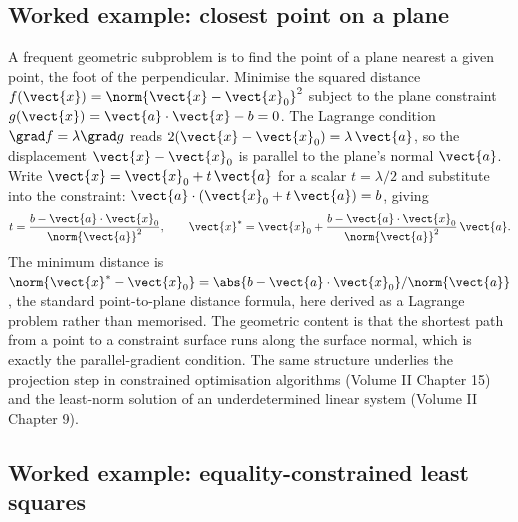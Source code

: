 \subsection{Worked example: closest point on a plane}

A frequent geometric subproblem is to find the point of a plane
nearest a given point, the foot of the perpendicular. Minimise the
squared distance $f(\vect{x}) = \norm{\vect{x} - \vect{x}_{0}}^{2}$
subject to the plane constraint $g(\vect{x}) = \vect{a} \cdot
\vect{x} - b = 0$. The Lagrange condition $\grad f = \lambda \grad
g$ reads $2(\vect{x} - \vect{x}_{0}) = \lambda\,\vect{a}$, so the
displacement $\vect{x} - \vect{x}_{0}$ is parallel to the plane's
normal $\vect{a}$. Write $\vect{x} = \vect{x}_{0} + t\,\vect{a}$ for
a scalar $t = \lambda/2$ and substitute into the constraint:
$\vect{a} \cdot (\vect{x}_{0} + t\,\vect{a}) = b$, giving
\[
t = \frac{b - \vect{a} \cdot \vect{x}_{0}}{\norm{\vect{a}}^{2}},
\qquad
\vect{x}^{*} = \vect{x}_{0} + \frac{b - \vect{a} \cdot \vect{x}_{0}}
{\norm{\vect{a}}^{2}}\,\vect{a}.
\]
The minimum distance is $\norm{\vect{x}^{*} - \vect{x}_{0}} =
\abs{b - \vect{a}\cdot\vect{x}_{0}}/\norm{\vect{a}}$, the standard
point-to-plane distance formula, here derived as a Lagrange problem
rather than memorised. The geometric content is that the shortest
path from a point to a constraint surface runs along the surface
normal, which is exactly the parallel-gradient condition. The same
structure underlies the projection step in constrained optimisation
algorithms (Volume II Chapter 15) and the least-norm solution of an
underdetermined linear system (Volume II Chapter 9).

\subsection{Worked example: equality-constrained least squares}

